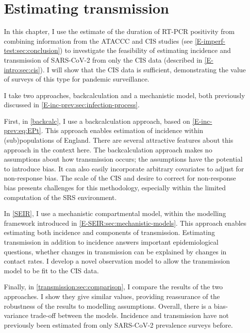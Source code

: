 \documentclass[thesis.tex]{subfiles}
\begin{document}
\ifSubfilesClassLoaded{
    \setcounter{chapter}{6}
}

\chapter{Estimating transmission} \label{transmission}

In this chapter, I use the estimate of the duration of RT-PCR positivity from combining information from the ATACCC and CIS studies (see \cref{E-imperf-test:sec:conclusion}) to investigate the feasibility of estimating incidence and transmission of SARS-CoV-2 from only the CIS data (described in \cref{E-intro:sec:cis}).
I will show that the CIS data is sufficient, demonstrating the value of surveys of this type for pandemic surveillance.

I take two approaches, backcalculation and a mechanistic model, both previously discussed in \cref{E-inc-prev:sec:infection-process}.

First, in \cref{backcalc}, I use a backcalculation approach, based on \cref{E-inc-prev:eq:EPt}.
This approach enables estimation of incidence within (sub)populations of England.
There are several attractive features about this approach in the context here.
The backcalculation approach makes no assumptions about how transmission occurs; the assumptions have the potential to introduce bias.
It can also easily incorporate arbitrary covariates to adjust for non-response bias.
The scale of the CIS and desire to correct for non-response bias presents challenges for this methodology, especially within the limited computation of the SRS environment.

In \cref{SEIR}, I use a mechanistic compartmental model, within the modelling framework introduced in \cref{E-SEIR:sec:mechanistic-models}.
This approach enables estimating both incidence and components of transmission.
Estimating transmission in addition to incidence answers important epidemiological questions, \eg whether changes in transmission can be explained by changes in contact rates.
I develop a novel observation model to allow the transmission model to be fit to the CIS data.

Finally, in \cref{transmission:sec:comparison}, I compare the results of the two approaches.
I show they give similar values, providing reassurance of the robustness of the results to modelling assumptions.
Overall, there is a bias-variance trade-off between the models.
Incidence and transmission have not previously been estimated from only SARS-CoV-2 prevalence surveys before.
\end{document}
